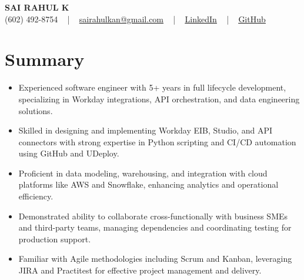 \documentclass[letterpaper,11pt]{article}
\newcommand{\resumeItem}[1]{
  \item\footnotesize{
    {#1 \vspace{-2pt}}
  }
}
\newcommand{\resumeItemListStart}{\begin{itemize}[leftmargin=*]}
\newcommand{\resumeItemListEnd}{\end{itemize}\vspace{-5pt}}
\begin{document}
\begin{center}
    {\fontsize{14pt}{12pt}\selectfont \textbf{\MakeUppercase{Sai Rahul K}}}\\ \vspace{2pt}
    \fontsize{10pt}{12pt}\selectfont (602) 492-8754 ~ | ~ \href{mailto:sairahulkan@gmail.com}{sairahulkan@gmail.com} ~ | ~
    \href{https://www.linkedin.com/in/rq123/}{\color{blue}\underline{LinkedIn}} ~ | ~
    \href{https://github.com/kanrahuldo}{\color{blue}\underline{GitHub}}~
    \vspace{-8pt}
\end{center}

\section{Summary}
\fontsize{9pt}{10pt}\selectfont
\resumeItemListStart
    \resumeItem{Experienced software engineer with 5+ years in full lifecycle development, specializing in Workday integrations, API orchestration, and data engineering solutions.}
    \resumeItem{Skilled in designing and implementing Workday EIB, Studio, and API connectors with strong expertise in Python scripting and CI/CD automation using GitHub and UDeploy.}
    \resumeItem{Proficient in data modeling, warehousing, and integration with cloud platforms like AWS and Snowflake, enhancing analytics and operational efficiency.}
    \resumeItem{Demonstrated ability to collaborate cross-functionally with business SMEs and third-party teams, managing dependencies and coordinating testing for production support.}
    \resumeItem{Familiar with Agile methodologies including Scrum and Kanban, leveraging JIRA and Practitest for effective project management and delivery.}
\resumeItemListEnd
\vspace{-6pt}
\end{document}
